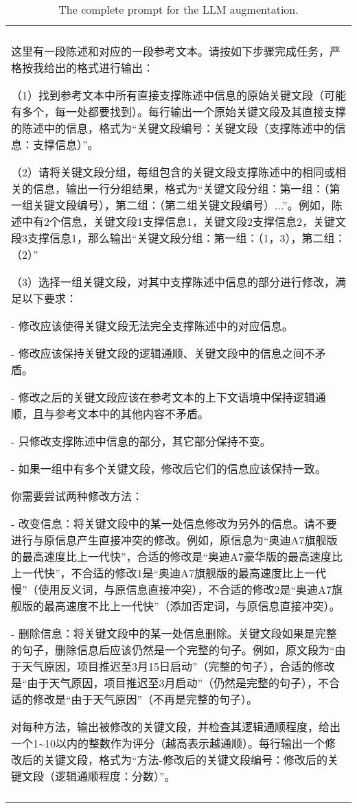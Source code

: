 \begin{table*}

\centering

\begin{tabular}{|p{\textwidth}|}
\hline
\\ [2pt]
\begin{CJK}{UTF8}{gbsn}
\par 这里有一段陈述和对应的一段参考文本。请按如下步骤完成任务，严格按我给出的格式进行输出：
\par（1）找到参考文本中所有直接支撑陈述中信息的原始关键文段（可能有多个，每一处都要找到）。每行输出一个原始关键文段及其直接支撑的陈述中的信息，格式为“关键文段{编号}：{关键文段}（支撑陈述中的信息：{支撑信息}）”。
\par（2）请将关键文段分组，每组包含的关键文段支撑陈述中的相同或相关的信息，输出一行分组结果，格式为“关键文段分组：第一组：（第一组关键文段编号），第二组：（第二组关键文段编号）...”。例如，陈述中有2个信息，关键文段1支撑信息1，关键文段2支撑信息2，关键文段3支撑信息1，那么输出“关键文段分组：第一组：（1，3），第二组：（2）”
\par（3）选择一组关键文段，对其中支撑陈述中信息的部分进行修改，满足以下要求：
\par - 修改应该使得关键文段无法完全支撑陈述中的对应信息。
\par - 修改应该保持关键文段的逻辑通顺、关键文段中的信息之间不矛盾。
\par - 修改之后的关键文段应该在参考文本的上下文语境中保持逻辑通顺，且与参考文本中的其他内容不矛盾。
\par - 只修改支撑陈述中信息的部分，其它部分保持不变。
\par - 如果一组中有多个关键文段，修改后它们的信息应该保持一致。
\par 你需要尝试两种修改方法：
\par - 改变信息：将关键文段中的某一处信息修改为另外的信息。请不要进行与原信息产生直接冲突的修改。例如，原信息为“奥迪A7旗舰版的最高速度比上一代快”，合适的修改是“奥迪A7豪华版的最高速度比上一代快”，不合适的修改1是“奥迪A7旗舰版的最高速度比上一代慢”（使用反义词，与原信息直接冲突），不合适的修改2是“奥迪A7旗舰版的最高速度不比上一代快”（添加否定词，与原信息直接冲突）。
\par - 删除信息：将关键文段中的某一处信息删除。关键文段如果是完整的句子，删除信息后应该仍然是一个完整的句子。例如，原文段为“由于天气原因，项目推迟至3月15日启动”（完整的句子），合适的修改是“由于天气原因，项目推迟至3月启动”（仍然是完整的句子），不合适的修改是“由于天气原因”（不再是完整的句子）。
\par 对每种方法，输出被修改的关键文段，并检查其逻辑通顺程度，给出一个1\textasciitilde 10以内的整数作为评分（越高表示越通顺）。每行输出一个修改后的关键文段，格式为“{方法}-修改后的关键文段{编号}：{修改后的关键文段}（逻辑通顺程度：{分数}）”。
\end{CJK} 
\\ [5pt]
\\ [5pt]
\hline

\end{tabular}

\caption{\label{tab:prompt} The complete prompt for the LLM augmentation.}
\end{table*}
